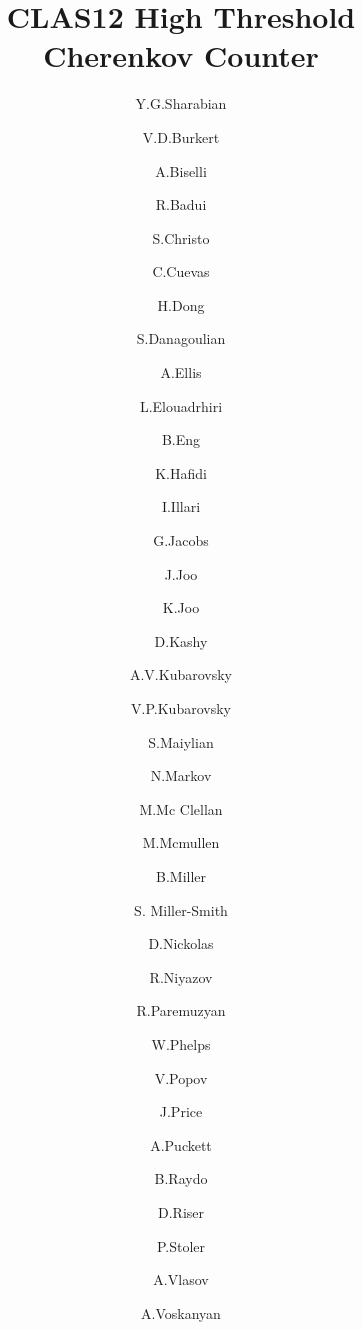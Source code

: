 \title{CLAS12 High Threshold Cherenkov Counter}

\author[1]{Y.G.Sharabian}
\author[1]{V.D.Burkert}
\author[2]{A.Biselli}
\author[13] {R.Badui}
\author[1]{S.Christo}
\author[1]{C.Cuevas}
\author[1]{H.Dong}
\author[3]{S.Danagoulian}
\author[1]{A.Ellis}
\author[1]{L.Elouadrhiri}
\author[1]{B.Eng}
\author[4]{K.Hafidi}
\author[5]{I.Illari}
\author[1]{G.Jacobs}
\author[6] {J.Joo}
\author[6]{K.Joo}
\author[1]{D.Kashy}
\author[6]{A.V.Kubarovsky}
\author[1]{V.P.Kubarovsky}
\author[7]{S.Maiylian}
\author[1]{N.Markov}
\author[6]{M.Mc Clellan}
\author[1]{M.Mcmullen}
\author[1]{B.Miller}
\author[11]{S. Miller-Smith}
\author[11]{D.Nickolas}
\author[8]{R.Niyazov}
\author[9]{R.Paremuzyan}
\author[10]{W.Phelps}
\author[1]{V.Popov}
\author[11]{J.Price}
\author[6]{A.Puckett}
\author[1]{B.Raydo}
\author[6]{D.Riser}
\author[8]{P.Stoler}
\author[12]{A.Vlasov}
\author[7]{A.Voskanyan}

\address[1]{Thomas Jefferson National Accelerator Facility}
\address[2]{Fairfield University}
\address[3]{North Carolina Agricultural and Technical State University}
\address[4]{Argonne National Laboratory}
\address[5]{George Washington Univercity}
\address[6]{University of Connecticut}
\address[7]{Yerevan Physics Institute}
\address[8]{Rensselaer Polytechnic Institute}
\address[9]{University of New Hampshire}
\address[10]{Christopher Newport University}
\address[11]{California State University, Dominguez Hills}
\address[12]{National Research Centre Kurchatov Institute - ITEP}
\address[13]{Florida International University}
